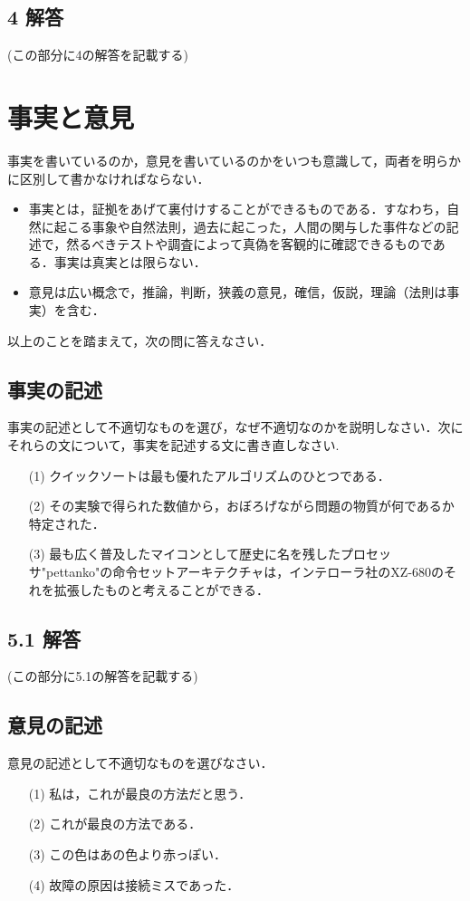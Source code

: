 \documentclass[11pt, a4paper]{jsarticle}
\begin{document}
\subsection*{4 解答}
(この部分に4の解答を記載する)

\newpage
\section{事実と意見}
事実を書いているのか，意見を書いているのかをいつも意識して，両者を明らかに区別して書かなければならない．
\begin{itemize}
    \item 事実とは，証拠をあげて裏付けすることができるものである．すなわち，自然に起こる事象や自然法則，過去に起こった，人間の関与した事件などの記述で，然るべきテストや調査によって真偽を客観的に確認できるものである．事実は真実とは限らない．
    \item 意見は広い概念で，推論，判断，狭義の意見，確信，仮説，理論（法則は事実）を含む．
\end{itemize}
以上のことを踏まえて，次の問に答えなさい．

\subsection{事実の記述}
事実の記述として不適切なものを選び，なぜ不適切なのかを説明しなさい．次にそれらの文について，事実を記述する文に書き直しなさい.
\begin{itemize}
    \item[(1)] クイックソートは最も優れたアルゴリズムのひとつである．
    \item[(2)] その実験で得られた数値から，おぼろげながら問題の物質が何であるか特定された．
    \item[(3)] 最も広く普及したマイコンとして歴史に名を残したプロセッサ"pettanko"の命令セットアーキテクチャは，インテローラ社のXZ-680のそれを拡張したものと考えることができる．
\end{itemize}
\subsection*{5.1 解答}
(この部分に5.1の解答を記載する)


\subsection{意見の記述}
意見の記述として不適切なものを選びなさい．
\begin{itemize}
\item[(1)] 私は，これが最良の方法だと思う．
\item[(2)] これが最良の方法である．
\item[(3)] この色はあの色より赤っぽい．
\item[(4)] 故障の原因は接続ミスであった．
\end{itemize}
\end{document}
